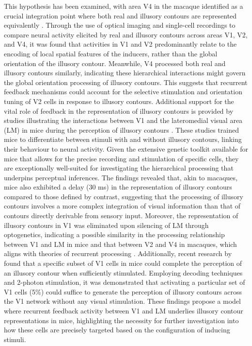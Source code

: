 \documentclass[12pt]{article}
\begin{document}
This hypothesis has been examined, with area V4 in the macaque identified as a crucial integration point where both real and illusory contours are represented equivalently \autocite{panEquivalentRepresentationReal2012}. Through the use of optical imaging and single-cell recordings to compare neural activity elicited by real and illusory contours across areas V1, V2, and V4, it was found that activities in V1 and V2 predominantly relate to the encoding of local spatial features of the inducers, rather than the global orientation of the illusory contour. Meanwhile, V4 processed both real and illusory contours similarly, indicating these hierarchical interactions might govern the global orientation processing of illusory contours. This suggests that recurrent feedback mechanisms could account for the selective stimulation and orientation tuning of V2 cells in response to illusory contours. Additional support for the vital role of feedback in the representation of illusory contours is provided by studies illustrating the interactions between V1 and the lateromedial visual area (LM) in mice during the perception of illusory contours \autocite{pakTopDownFeedbackControls2020}. These studies trained mice to differentiate between stimuli with and without illusory contours, linking their behaviour to neural activity. Given the extensive genetic toolkit available for mice that allows for the precise recording and stimulation of specific cells, they are exceptionally well-suited for investigating the hierarchical processing that underpins perceptual inferences. The findings revealed that, akin to macaques, mice also exhibited a delay (30 ms) in the representation of illusory contours compared to those defined by contrast, suggesting that the processing of illusory contours involves a more complex integration of visual information than that of contours directly derivable from sensory input. Moreover, the representation of illusory contours in V1 was eliminated upon silencing of LM through optogenetics, indicating a possible similarity in the processing relationship between V1 and LM in mice and that between V2 and V4 in macaques, which aligns with theories of recurrent processing \autocite{wyatteEarlyRecurrentFeedback2014}. Additionally, recent research by \cite{shinRecurrentPatternCompletion2023} found that a specific subset of V1 cells in mice could complete the perception of an illusory contour when sufficiently stimulated. Employing decoding techniques and 2-photon stimulation, it was demonstrated that activating a particular set of V1 cells (5\%) could suffice to generate the perception of illusory contours across the V1 network without any visual stimulation. These findings propose a model where recurrent feedback activity between V1 and LM underlies illusory contour representations in mice, highlighting the necessity for further investigation into how these cells are precisely targeted based on the configuration of inducing stimuli.
\end{document}
